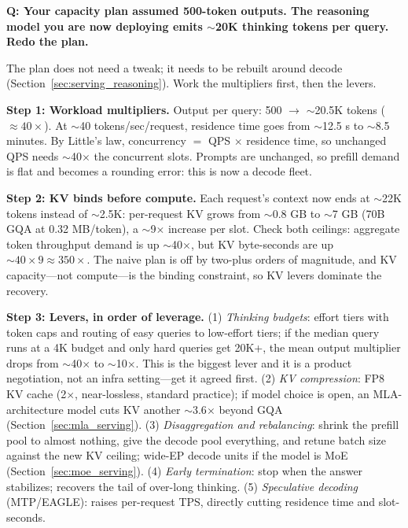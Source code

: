 \begin{interviewq}
\textbf{Q: Your capacity plan assumed 500-token outputs. The reasoning model you are now deploying emits $\sim$20K thinking tokens per query. Redo the plan.}

 \quad {} \quad \badgefreq{\freqhigh}

\stronganswer

The plan does not need a tweak; it needs to be rebuilt around decode (Section~\ref{sec:serving_reasoning}). Work the multipliers first, then the levers.

\textbf{Step 1: Workload multipliers.} Output per query: 500 $\to$ $\sim$20.5K tokens ($\approx 40\times$). At $\sim$40 tokens/sec/request, residence time goes from $\sim$12.5 s to $\sim$8.5 minutes. By Little's law, concurrency $=$ QPS $\times$ residence time, so unchanged QPS needs $\sim$40$\times$ the concurrent slots. Prompts are unchanged, so prefill demand is flat and becomes a rounding error: this is now a decode fleet.

\textbf{Step 2: KV binds before compute.} Each request's context now ends at $\sim$22K tokens instead of $\sim$2.5K: per-request KV grows from $\sim$0.8 GB to $\sim$7 GB (70B GQA at 0.32 MB/token), a $\sim$9$\times$ increase per slot. Check both ceilings: aggregate token throughput demand is up $\sim$40$\times$, but KV byte-seconds are up $\sim 40 \times 9 \approx 350\times$. The naive plan is off by two-plus orders of magnitude, and KV capacity---not compute---is the binding constraint, so KV levers dominate the recovery.

\textbf{Step 3: Levers, in order of leverage.} (1) \textit{Thinking budgets}: effort tiers with token caps and routing of easy queries to low-effort tiers; if the median query runs at a 4K budget and only hard queries get 20K+, the mean output multiplier drops from $\sim$40$\times$ to $\sim$10$\times$. This is the biggest lever and it is a product negotiation, not an infra setting---get it agreed first. (2) \textit{KV compression}: FP8 KV cache (2$\times$, near-lossless, standard practice); if model choice is open, an MLA-architecture model cuts KV another $\sim$3.6$\times$ beyond GQA (Section~\ref{sec:mla_serving}). (3) \textit{Disaggregation and rebalancing}: shrink the prefill pool to almost nothing, give the decode pool everything, and retune batch size against the new KV ceiling; wide-EP decode units if the model is MoE (Section~\ref{sec:moe_serving}). (4) \textit{Early termination}: stop when the answer stabilizes; recovers the tail of over-long thinking. (5) \textit{Speculative decoding} (MTP/EAGLE): raises per-request TPS, directly cutting residence time and slot-seconds.


\end{interviewq}
